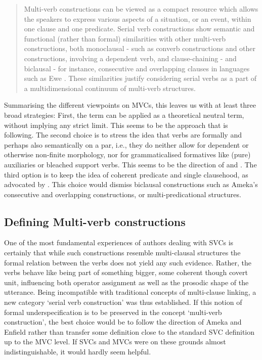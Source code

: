 \begin{quote}Multi-verb constructions can be viewed as a compact resource which allows the speakers to express various aspects of a situation, or an event, within one clause and one predicate. Serial verb constructions show semantic and functional (rather than formal) similarities with other multi-verb constructions, both monoclausal - such as converb constructions and other constructions, involving a dependent verb, and clause-chaining - and biclausal - for instance, consecutive and overlapping clauses in languages such as Ewe \citep{ameka2006ewe}. These similarities justify considering serial verbs as a part of a multidimensional continuum of multi-verb structures. \citep[21]{Aikhenvald2011}\end{quote}

Summarising the different viewpoints on MVCs, this leaves us with at least three broad strategies: First, the term can be applied as a theoretical neutral term, without implying any strict limit. This seems to be the approach that \citet{nordhoff2012} is following. The second choice is to stress the idea that verbs are formally and perhaps also semantically on a par, i.e., they do neither allow for dependent or otherwise non-finite morphology, nor for grammaticalised formatives like (pure) auxiliaries or bleached support verbs. This seems to be the direction of \citet{ameka2005multiverb, ameka2006ewe} and \citet{enfield2008verbs}. The third option is to keep the idea of coherent predicate and single clausehood, as advocated by \citet{Aikhenvald2011}. This choice would dismiss biclausal constructions such as Ameka's consecutive and overlapping constructions, or multi-predicational structures.

\subsection{Defining Multi-verb constructions}\label{sec:defining}

One of the most fundamental experiences of authors dealing with SVCs is certainly that while such constructions resemble multi-clausal structures the formal relation between the verbs does not yield any such evidence. Rather, the verbs behave like being part of something bigger, some coherent though covert unit, influencing both operator assignment as well as the prosodic shape of the utterance. Being incompatible with traditional concepts of multi-clause linking, a new category `serial verb construction' was thus established. If this notion of formal underspecification is to be preserved in the concept `multi-verb construction', the best choice would be to follow the direction of Ameka and Enfield rather than transfer some definition close to the standard SVC definition up to the MVC level. If SVCs and MVCs were on these grounds almost indistinguishable, it would hardly seem helpful.

